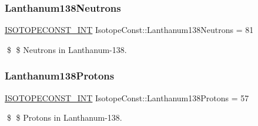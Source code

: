 \subsubsection{\texorpdfstring{Lanthanum138\+Neutrons}{Lanthanum138Neutrons}}
{\footnotesize\ttfamily \mbox{\hyperlink{group___isotope_const-_macros_ga5f18360b3e99483a35c32d789e62621c}{I\+S\+O\+T\+O\+P\+E\+C\+O\+N\+S\+T\+\_\+\+I\+NT}} Isotope\+Const\+::\+Lanthanum138\+Neutrons = 81}

\$ \$ Neutrons in Lanthanum-\/138. \mbox{\label{group___isotope_const-_lanthanum-_la138_gabcad7ac3a0679087c5219be8dbaa887d}} 
\subsubsection{\texorpdfstring{Lanthanum138\+Protons}{Lanthanum138Protons}}
{\footnotesize\ttfamily \mbox{\hyperlink{group___isotope_const-_macros_ga5f18360b3e99483a35c32d789e62621c}{I\+S\+O\+T\+O\+P\+E\+C\+O\+N\+S\+T\+\_\+\+I\+NT}} Isotope\+Const\+::\+Lanthanum138\+Protons = 57}

\$ \$ Protons in Lanthanum-\/138. 